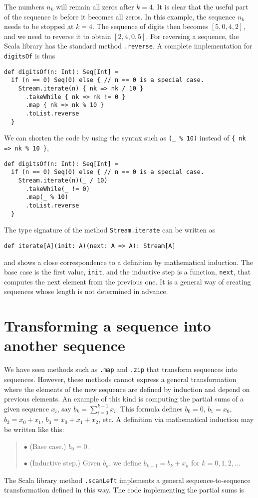 \noindent The numbers $n_{k}$ will remain all zeros after $k=4$.
It is clear that the useful part of the sequence is before it becomes
all zeros. In this example, the sequence $n_{k}$ needs to be stopped
at $k=4$. The sequence of digits then becomes $\left[5,0,4,2\right]$,
and we need to reverse it to obtain $\left[2,4,0,5\right]$. For reversing
a sequence, the Scala library has the standard method \lstinline!.reverse!.
A complete implementation for \lstinline!digitsOf! is thus
\begin{lstlisting}
def digitsOf(n: Int): Seq[Int] =
  if (n == 0) Seq(0) else { // n == 0 is a special case.
    Stream.iterate(n) { nk => nk / 10 }
      .takeWhile { nk => nk != 0 }
      .map { nk => nk % 10 }
      .toList.reverse
  }
\end{lstlisting}
We can shorten the code by using the syntax such as \lstinline!(_ % 10)!
instead of \lstinline!{ nk => nk % 10 }!, 
\begin{lstlisting}
def digitsOf(n: Int): Seq[Int] =
  if (n == 0) Seq(0) else { // n == 0 is a special case.
    Stream.iterate(n)(_ / 10)
      .takeWhile(_ != 0)
      .map(_ % 10)
      .toList.reverse
  }
\end{lstlisting}

The type signature of the method \lstinline!Stream.iterate! can be
written as
\begin{lstlisting}
def iterate[A](init: A)(next: A => A): Stream[A]
\end{lstlisting}
and shows a close correspondence to a definition by mathematical induction.
The base case is the first value, \lstinline!init!, and the inductive
step is a function, \lstinline!next!, that computes the next element
from the previous one. It is a general way of creating sequences whose
length is not determined in advance.

\section{Transforming a sequence into another sequence}

We have seen methods such as \lstinline!.map! and \lstinline!.zip!
that transform sequences into sequences. However, these methods cannot
express a general transformation where the elements of the new sequence
are defined by induction and depend on previous elements. An example
of this kind is computing the partial sums of a given sequence $x_{i}$,
say $b_{k}=\sum_{i=0}^{k-1}x_{i}$. This formula defines $b_{0}=0$,
$b_{1}=x_{0}$, $b_{2}=x_{0}+x_{1}$, $b_{3}=x_{0}+x_{1}+x_{2}$,
etc. A definition via mathematical induction may be written like this:
\begin{quotation}
$\bullet$ (Base case.) $b_{0}=0$.

$\bullet$ (Inductive step.) Given $b_{k}$, we define $b_{k+1}=b_{k}+x_{k}$
for $k=0,1,2,...$
\end{quotation}
The Scala library method \lstinline!.scanLeft! implements a general
sequence-to-sequence transformation defined in this way. The code
implementing the partial sums is

